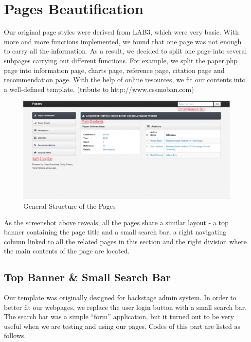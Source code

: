 \documentclass{book}
\begin{document}
\section {Pages Beautification}

Our original page styles were derived from LAB3, which were very basic. With more and more functions implemented, we found that one page was not enough to carry all the information. As a result, we decided to split one page into several subpages carrying out different functions. For example, we split the paper.php page into information page, charts page, reference page, citation page and recommendation page. With the help of online resources, we fit our contents into a well-defined template. (tribute to http://www.cssmoban.com)


\begin{figure}[H]
\centering{}
\includegraphics[scale=0.35]{img/zlt_beau_demo.png}
\caption{General Structure of the Pages}
\end{figure}

As the screenshot above reveals, all the pages share a similar layout - a top banner containing the page title and a small search bar, a right navigating column linked to all the related pages in this section and the right division where the main contents of the page are located.

\subsection {Top Banner \& Small Search Bar}

Our template was originally designed for backstage admin system. In order to better fit our webpages, we replace the user login button with a small search bar. The search bar was a simple ``form'' application, but it turned out to be very useful when we are testing and using our pages. Codes of this part are listed as follows.
\end{document}
